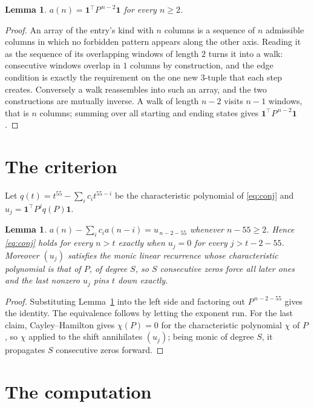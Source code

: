 \documentclass[11pt,a4paper]{article}
\theoremstyle{plain}
\newtheorem{lemma}[theorem]{Lemma}
\theoremstyle{definition}
\begin{document}
\begin{lemma}\label{lem:walk}
$a(n)=\mathbf{1}^{\!\top}P^{\,n-2}\mathbf{1}$ for every $n\ge2$.
\end{lemma}

\begin{proof}
An array of the entry's kind with $n$ columns is a sequence of $n$ admissible columns in
which no forbidden pattern appears along the other axis. Reading it as the sequence of its
overlapping windows of length $2$ turns it into a walk: consecutive windows overlap in
$1$ columns by construction, and the edge condition is exactly the requirement on the one
new $3$-tuple that each step creates. Conversely a walk reassembles into such an array,
and the two constructions are mutually inverse. A walk of length $n-2$ visits $n-1$
windows, that is $n$ columns; summing over all starting and ending states gives
$\mathbf{1}^{\!\top}P^{\,n-2}\mathbf{1}$.
\end{proof}

\section{The criterion}

Let $q(t)=t^{55}-\sum_i c_i t^{55-i}$ be the characteristic polynomial of
\eqref{eq:conj} and $u_j=\mathbf{1}^{\!\top}P^{j}q(P)\mathbf{1}$.

\begin{lemma}\label{lem:crit}
$a(n)-\sum_i c_i a(n-i)=u_{\,n-2-55}$ whenever $n-55\ge2$. Hence
\eqref{eq:conj} holds for every $n>t$ exactly when $u_j=0$ for every
$j>t-2-55$. Moreover $(u_j)$ satisfies the monic linear recurrence whose
characteristic polynomial is that of $P$, of degree $S$, so $S$ consecutive zeros force all
later ones and the last nonzero $u_j$ pins $t$ down exactly.
\end{lemma}

\begin{proof}
Substituting Lemma~\ref{lem:walk} into the left side and factoring out
$P^{\,n-2-55}$ gives the identity. The equivalence follows by letting the exponent
run. For the last claim, Cayley--Hamilton gives $\chi(P)=0$ for the characteristic
polynomial $\chi$ of $P$, so $\chi$ applied to the shift annihilates $(u_j)$; being monic of
degree $S$, it propagates $S$ consecutive zeros forward.
\end{proof}

\section{The computation}
\end{document}
